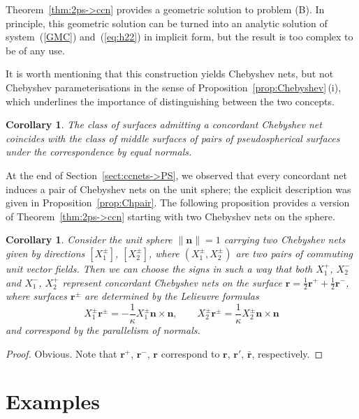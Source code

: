 \documentclass[pdftex]{sigma}
\let\ve\mathbf
\def\k{\kappa}
\def\eqref#1{{\rm(\ref{#1})}}
\newtheorem{Corollary}[Theorem]{Corollary}
\numberwithin{equation}{section}
\begin{document}
Theorem~\ref{thm:2ps->ccn} provides a geometric solution to problem (B).
In principle, this geometric solution can be turned into an analytic
solution of system~\eqref{GMC} and~\eqref{eq:h22} in implicit form,
but the result is too complex to be of any use.


It is worth mentioning that this construction yields
Chebyshev nets, but not Chebyshev parameterisations in the sense of
Proposition~\ref{prop:Chebyshev}\,(i), which underlines the
importance of distinguishing between the two concepts.


\begin{Corollary}
The class of surfaces admitting a concordant Chebyshev net
coincides with the class of middle surfaces of pairs of
pseudospherical surfaces under the correspondence by equal normals.
\end{Corollary}

At the end of Section~\ref{sect:ccnets->PS}, we observed that
every concordant net induces a pair of Chebyshev nets on the
unit sphere; the explicit description was given in
Proposition~\ref{prop:Chpair}.
The following proposition provides a version of Theorem~\ref{thm:2ps->ccn} starting with two
Chebyshev nets on the sphere.


\begin{Corollary}
Consider the unit sphere $\| \ve n \| = 1$ carrying two Chebyshev nets given by
directions $[X^\pm_1]$, $[X^\pm_2]$, where $(X^\pm_1, X^\pm_2)$ are two pairs
of commuting unit vector fields.
Then we can choose the signs in such a way that both $X^+_1$, $X^-_2$ and $X^-_1$, $X^+_2$
represent concordant Chebyshev nets on the surface
$\ve r = \frac12 \ve r^+ + \frac12 \ve r^-$, where  surfaces $\ve r^\pm$ are determined
by the Lelieuvre formulas
\[
X_1^\pm \ve r^\pm
 = -\frac{1}{\k} X_1^\pm \ve n \times \ve n,
\qquad
X_2^\pm \ve r^\pm
 = \frac{1}{\k} X_2^\pm \ve n \times \ve n
\]
and correspond by the parallelism of normals.
\end{Corollary}

\begin{proof}
Obvious.
Note that $\ve r^+$, $\ve r^-$, $\ve r$ correspond to $\ve r$, $\ve r'$, $\bar{\ve r}$, respectively.
\end{proof}

\section{Examples}
\label{sect:ex}
\end{document}
